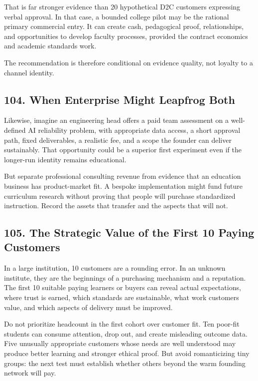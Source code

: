 That is far stronger evidence than 20 hypothetical D2C customers expressing verbal approval. In that case, a bounded college pilot may be the rational primary commercial entry. It can create cash, pedagogical proof, relationships, and opportunities to develop faculty processes, provided the contract economics and academic standards work.

The recommendation is therefore conditional on evidence quality, not loyalty to a channel identity.

\subsection*{104. When Enterprise Might Leapfrog Both}

Likewise, imagine an engineering head offers a paid team assessment on a well-defined AI reliability problem, with appropriate data access, a short approval path, fixed deliverables, a realistic fee, and a scope the founder can deliver sustainably. That opportunity could be a superior first experiment even if the longer-run identity remains educational.

But separate professional consulting revenue from evidence that an education business has product-market fit. A bespoke implementation might fund future curriculum research without proving that people will purchase standardized instruction. Record the assets that transfer and the aspects that will not.

\subsection*{105. The Strategic Value of the First 10 Paying Customers}

In a large institution, 10 customers are a rounding error. In an unknown institute, they are the beginnings of a purchasing mechanism and a reputation. The first 10 suitable paying learners or buyers can reveal actual expectations, where trust is earned, which standards are sustainable, what work customers value, and which aspects of delivery must be improved.

Do not prioritize headcount in the first cohort over customer fit. Ten poor-fit students can consume attention, drop out, and create misleading outcome data. Five unusually appropriate customers whose needs are well understood may produce better learning and stronger ethical proof. But avoid romanticizing tiny groups: the next test must establish whether others beyond the warm founding network will pay.

